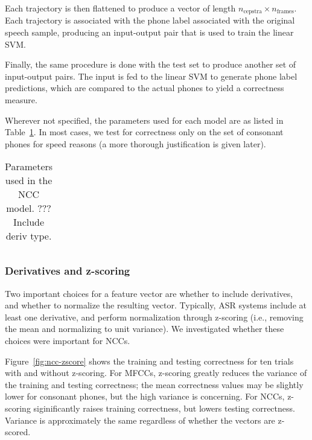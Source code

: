 Each trajectory is then flattened
to produce a vector of length
$n_{\text{cepstra}} \times n_{\text{frames}}$.
Each trajectory is associated with
the phone label associated with
the original speech sample,
producing an input-output pair
that is used to train the linear SVM.

Finally, the same procedure is done
with the test set to produce another
set of input-output pairs.
The input is fed to the linear SVM
to generate phone label predictions,
which are compared to the actual phones
to yield a correctness measure.

Wherever not specified,
the parameters used for each model
are as listed in Table~\ref{tab:ncc}.
In most cases, we test for correctness
only on the set of consonant phones
for speed reasons
(a more thorough justification is given
later).

\begin{table}[ht!]
  \begin{small}
    \begin{tabular}{}
    \end{tabular}
 \end{small}
  \caption[Parameters for NCC model.]{
    Parameters used in the NCC model. ???
    Include deriv type.}
\label{tab:ncc}
\end{table}

\subsubsection{Derivatives and z-scoring}

Two important choices for a feature vector
are whether to include derivatives,
and whether to normalize the resulting vector.
Typically, ASR systems include at least
one derivative, and perform normalization
through z-scoring
(i.e., removing the mean
and normalizing to unit variance).
We investigated whether these
choices were important for NCCs.


Figure~\ref{fig:ncc-zscore} shows
the training and testing correctness
for ten trials
with and without z-scoring.
For MFCCs,
z-scoring greatly reduces the variance
of the training and testing correctness;
the mean correctness values
may be slightly lower
for consonant phones,
but the high variance is concerning.
For NCCs,
z-scoring siginificantly
raises training correctness,
but lowers testing correctness.
Variance is approximately the same
regardless of whether the vectors are z-scored.

